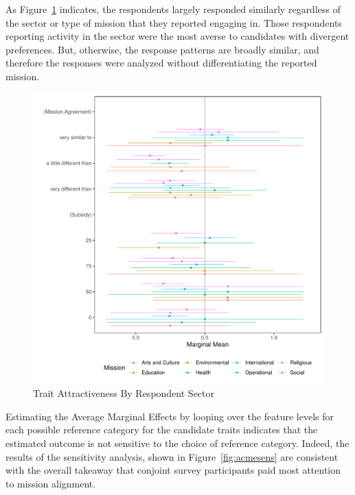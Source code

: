 As Figure~\ref{fig:traitssector} indicates, the respondents largely responded similarly regardless of the sector or type of mission that they reported engaging in. Those respondents reporting activity in the  sector were the most averse to candidates with divergent preferences. But, otherwise, the response patterns are broadly similar, and therefore the responses were analyzed without differentiating the reported mission.

\begin{figure}
\centering
    \includegraphics[width=.95\columnwidth]{./Pictures/traitsBySector.pdf}
    \caption{Trait Attractiveness By Respondent Sector}
    \label{fig:traitssector}
\end{figure}

Estimating the Average Marginal Effects by looping over the feature levels for each possible reference category for the candidate traits indicates that the estimated outcome is not sensitive to the choice of reference category. Indeed, the results of the sensitivity analysis, shown in Figure~\ref{fig:acmesens} are consistent with the overall takeaway that conjoint survey participants paid most attention to mission alignment.


